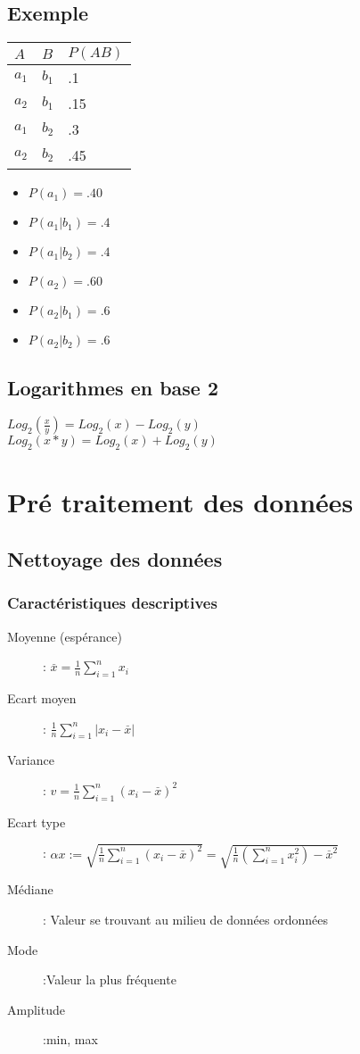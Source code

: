 \section{Exemple}
\begin{multicols}{2}
[]
\begin{tabular}{ll|l}
  \hline
  $A$&$B$&$P(AB)$\\
  \hline
  $a_1$&$b_1$&.1\\
  $a_2$&$b_1$&.15\\
  $a_1$&$b_2$&.3\\
  $a_2$&$b_2$&.45\\
  \hline
\end{tabular}

\begin{itemize}
\item $P(a_1) = .40$
\item $P(a_1|b_1) = .4$
\item $P(a_1|b_2) = .4$
\item $P(a_2) = .60$
\item $P(a_2|b_1) = .6$
\item $P(a_2|b_2) = .6$
\end{itemize}

\end{multicols}

\section{Logarithmes en base 2}
$Log_2(\frac{x}{y}) = Log_2(x) - Log_2(y)$\\
$Log_2(x*y) = Log_2(x) + Log_2(y)$\\

\chapter{Pré traitement des données}
\section{Nettoyage des données}
\subsection{Caractéristiques descriptives}

\begin{description}
\item[Moyenne (espérance)]: $\overset{\_}{x}=\frac{1}{n} \sum_{i=1}^n x_i$
\item[Ecart moyen]: $\frac{1}{n} \sum_{i=1}^n |x_i - \overset{\_}{x} |$
\item[Variance]: $v = \frac{1}{n} \sum_{i=1}^n (x_i - \overset{\_}{x} )^2$
\item[Ecart type]: $\alpha x := \sqrt{\frac{1}{n} \sum_{i=1}^n (x_i - \overset{\_}{x} )^2} = \sqrt{\frac{1}{n}(\sum_{i=1}^n x_i^2) - \overset{\_}{x}^2 }$
\item[Médiane]: Valeur se trouvant au milieu de données ordonnées
\item[Mode]:Valeur la plus fréquente 
\item[Amplitude]:min, max
\end{description}


